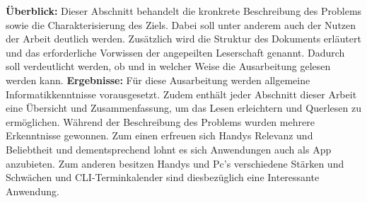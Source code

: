 
\textbf{Überblick:}
Dieser Abschnitt behandelt die kronkrete Beschreibung des Problems sowie die Charakterisierung des Ziels. Dabei soll unter anderem auch der Nutzen der Arbeit deutlich werden.\newline
Zusätzlich wird die Struktur des Dokuments erläutert und das erforderliche Vorwissen der angepeilten Leserschaft genannt. Dadurch soll verdeutlicht werden, ob und in welcher Weise die Ausarbeitung gelesen werden kann.\newline
\textbf{Ergebnisse:}
Für diese Ausarbeitung werden allgemeine Informatikkenntnisse vorausgesetzt. 
Zudem enthält jeder Abschnitt dieser Arbeit eine Übersicht und Zusammenfassung, um das Lesen erleichtern und Querlesen zu ermöglichen.\newline
Während der Beschreibung des Problems wurden mehrere Erkenntnisse gewonnen. Zum einen erfreuen sich Handys Relevanz und Beliebtheit und dementsprechend lohnt es sich Anwendungen auch als App anzubieten. Zum anderen besitzen Handys und Pc's verschiedene Stärken und Schwächen und CLI-Terminkalender sind diesbezüglich eine Interessante Anwendung.